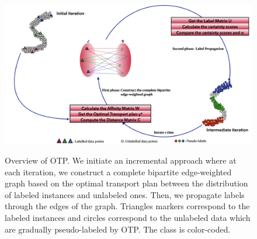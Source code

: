 \documentclass[conference]{IEEEtran}
\begin{document}
\begin{figure}[h]
	\centering
\includegraphics[width=1.\textwidth]{Algorithm.jpeg}
	\label{fig:pccccs}
	\caption{Overview of OTP. We initiate an incremental approach where at each iteration, we construct a complete bipartite edge-weighted graph based on the optimal transport plan between the distribution of labeled instances and unlabeled ones. Then, we propagate labels through the edges of the graph. Triangles markers correspond to the labeled instances and circles correspond to the unlabeled data which are gradually pseudo-labeled by OTP. The class is color-coded.}
\end{figure}
\end{document}
